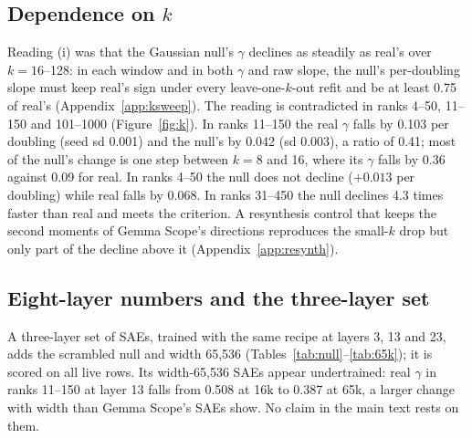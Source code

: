 \documentclass[10pt,twocolumn]{article}
\newcommand{\Sig}{\Sigma}
\begin{document}
\subsection{Dependence on $k$}
\label{app:gk}


Reading (i) was that the Gaussian null's $\gamma$ declines as steadily as real's over $k=16$--128: in each window and in both $\gamma$ and raw slope, the null's per-doubling slope must keep real's sign under every leave-one-$k$-out refit and be at least 0.75 of real's (Appendix~\ref{app:ksweep}). The reading is contradicted in ranks 4--50, 11--150 and 101--1000 (Figure~\ref{fig:k}). In ranks 11--150 the real $\gamma$ falls by 0.103 per doubling (seed sd 0.001) and the null's by 0.042 (sd 0.003), a ratio of 0.41; most of the null's change is one step between $k=8$ and 16, where its $\gamma$ falls by 0.36 against 0.09 for real. In ranks 4--50 the null does not decline ($+0.013$ per doubling) while real falls by 0.068. In ranks 31--450 the null declines 4.3 times faster than real and meets the criterion. A resynthesis control that keeps the second moments of Gemma Scope's directions reproduces the small-$k$ drop but only part of the decline above it (Appendix~\ref{app:resynth}).

\subsection{Eight-layer numbers and the three-layer set}
\label{app:65k}

\begin{table}[!htb]
\centering
\caption{Eight layers of Gemma-2-2B at $k=40$, width 16,384: decoder eigen-slope at 8,192 live latents (mean of three seeds), the largest seed sd over the four windows, eval FVU, live latents (range over seeds, of 16,384), and $\Sig$'s slope from the 10M training tokens.}
\label{tab:null8}
\footnotesize
\setlength{\tabcolsep}{4pt}

\end{table}

A three-layer set of SAEs, trained with the same recipe at layers 3, 13 and 23, adds the scrambled null and width 65,536 (Tables~\ref{tab:null}--\ref{tab:65k}); it is scored on all live rows. Its width-65,536 SAEs appear undertrained: real $\gamma$ in ranks 11--150 at layer 13 falls from 0.508 at 16k to 0.387 at 65k, a larger change with width than Gemma Scope's SAEs show. No claim in the main text rests on them.
\end{document}
